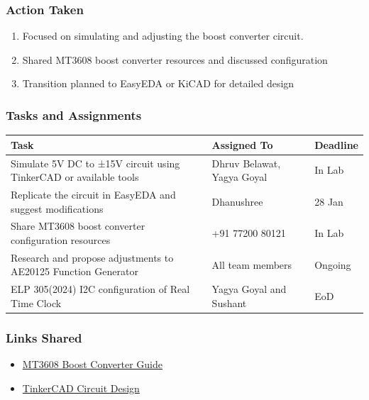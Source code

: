 \documentclass[12pt,a4paper]{article}
\begin{document}
\subsubsection*{Action Taken}
\begin{enumerate}
    \item Focused on simulating and adjusting the boost converter circuit.
    \item Shared MT3608 boost converter resources and discussed configuration
    \item Transition planned to EasyEDA or KiCAD for detailed design
\end{enumerate}

\newpage
\subsubsection*{Tasks and Assignments}
\renewcommand{\arraystretch}{1.5}
\begin{table}[h!]

\begin{tabular}{|m{6cm}|>{\raggedright\arraybackslash}m{4cm}|m{4cm}|}
    \hline
    \textbf{Task} & \textbf{Assigned To} & \textbf{Deadline} \\
    \hline
    Simulate 5V DC to ±15V circuit using TinkerCAD or available tools & Dhruv Belawat, Yagya Goyal & In Lab \\
    \hline
    Replicate the circuit in EasyEDA and suggest modifications & Dhanushree & 28 Jan \\
    \hline
    Share MT3608 boost converter configuration resources & +91 77200 80121 & In Lab \\
    \hline
    Research and propose adjustments to AE20125 Function Generator & All team members & Ongoing \\
    \hline
    ELP 305(2024) I2C configuration of Real Time Clock & Yagya Goyal and Sushant & EoD \\
    \hline
\end{tabular}
\end{table}


\subsubsection*{Links Shared}
\begin{itemize}
    \item \href{https://www.instructables.com/DC-DC-Boost-Converter-MT3608/}{MT3608 Boost Converter Guide}
    \item \href{https://www.tinkercad.com/login?next=%2Fthings%2Fgf0q0Ncw5p9%2Feditel%3Fsharecode%3Djc-TJ9JB5M20FsJDGMxoH8T5PApp168cANJCAp8Wo6Q}{TinkerCAD Circuit Design}
\end{itemize}
\end{document}
